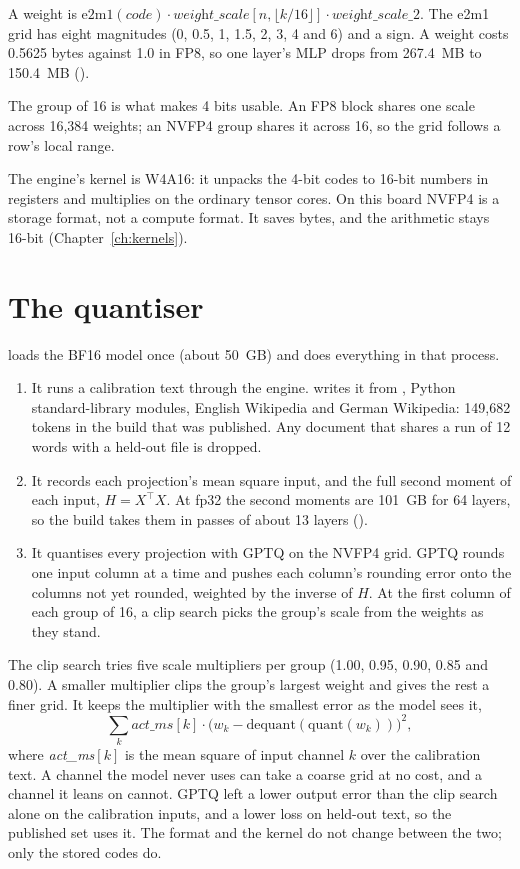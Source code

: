 A weight is $\text{e2m1}(\textit{code}) \cdot \textit{weight\_scale}[n, \lfloor k/16 \rfloor] \cdot \textit{weight\_scale\_2}$. The e2m1 grid has eight magnitudes (0, 0.5, 1, 1.5, 2, 3, 4 and 6) and a sign. A weight costs 0.5625 bytes against 1.0 in FP8, so one layer's MLP drops from 267.4~MB to 150.4~MB (\arith).

The group of 16 is what makes 4 bits usable. An FP8 block shares one scale across 16,384 weights; an NVFP4 group shares it across 16, so the grid follows a row's local range.

The engine's kernel is W4A16: it unpacks the 4-bit codes to 16-bit numbers in registers and multiplies on the ordinary tensor cores. On this board NVFP4 is a storage format, not a compute format. It saves bytes, and the arithmetic stays 16-bit (Chapter~\ref{ch:kernels}).

\section{The quantiser}

 loads the BF16 model once (about 50~GB) and does everything in that process.

\begin{enumerate}
\item It runs a calibration text through the engine.  writes it from , Python standard-library modules, English Wikipedia and German Wikipedia: 149,682 tokens in the build that was published. Any document that shares a run of 12 words with a held-out file is dropped.
\item It records each projection's mean square input, and the full second moment of each input, $H = X^\top X$. At fp32 the second moments are 101~GB for 64 layers, so the build takes them in passes of about 13 layers ().
\item It quantises every projection with GPTQ on the NVFP4 grid. GPTQ rounds one input column at a time and pushes each column's rounding error onto the columns not yet rounded, weighted by the inverse of $H$. At the first column of each group of 16, a clip search picks the group's scale from the weights as they stand.
\end{enumerate}

The clip search tries five scale multipliers per group (1.00, 0.95, 0.90, 0.85 and 0.80). A smaller multiplier clips the group's largest weight and gives the rest a finer grid. It keeps the multiplier with the smallest error as the model sees it,
\[
\sum_k \textit{act\_ms}[k] \cdot \bigl(w_k - \text{dequant}(\text{quant}(w_k))\bigr)^2,
\]
where \textit{act\_ms}$[k]$ is the mean square of input channel $k$ over the calibration text. A channel the model never uses can take a coarse grid at no cost, and a channel it leans on cannot. GPTQ left a lower output error than the clip search alone on the calibration inputs, and a lower loss on held-out text, so the published set uses it. The format and the kernel do not change between the two; only the stored codes do.

